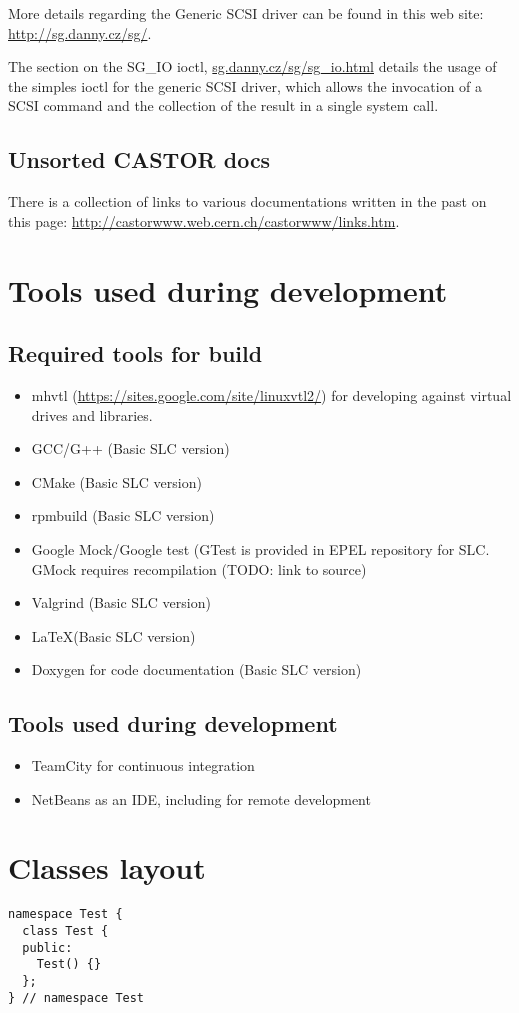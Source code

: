 More details regarding the Generic SCSI driver can be found in this web site: 
\href{http://sg.danny.cz/sg/}{http://sg.danny.cz/sg/}.

The section on the SG\_IO ioctl, \href{sg.danny.cz/sg/sg\_io.html}{sg.danny.cz/sg/sg\_io.html} details the usage of the 
simples ioctl for the generic SCSI driver, which allows the invocation of a SCSI command and the collection of the 
result in a single system call.

\subsection{Unsorted CASTOR docs}
There is a collection of links to various documentations written in the past on this page:
\href{http://castorwww.web.cern.ch/castorwww/links.htm}{http://castorwww.web.cern.ch/castorwww/links.htm}.

\section{Tools used during development}
\subsection{ Required tools for build}
\begin{itemize}
\item{}mhvtl (\href{https://sites.google.com/site/linuxvtl2/}{https://sites.google.com/site/linuxvtl2/}) for developing against virtual drives and libraries.
\item{}GCC/G++ (Basic SLC version)
\item{}CMake (Basic SLC version)
\item{}rpmbuild (Basic SLC version)
\item{}Google Mock/Google test (GTest is provided in EPEL repository for SLC. 
  GMock requires recompilation (TODO: link to source)
\item{}Valgrind (Basic SLC version)
\item{}\LaTeX (Basic SLC version)
\item{}Doxygen for code documentation (Basic SLC version)
\end{itemize}

\subsection{Tools used during development}
\begin{itemize}
\item{}TeamCity for continuous integration
\item{}NetBeans as an IDE, including for remote development\
\end{itemize}

\section{Classes layout}

\begin{lstlisting}[caption=Code example,label=code1]
namespace Test {
  class Test {
  public:
    Test() {}
  };
} // namespace Test
\end{lstlisting}


